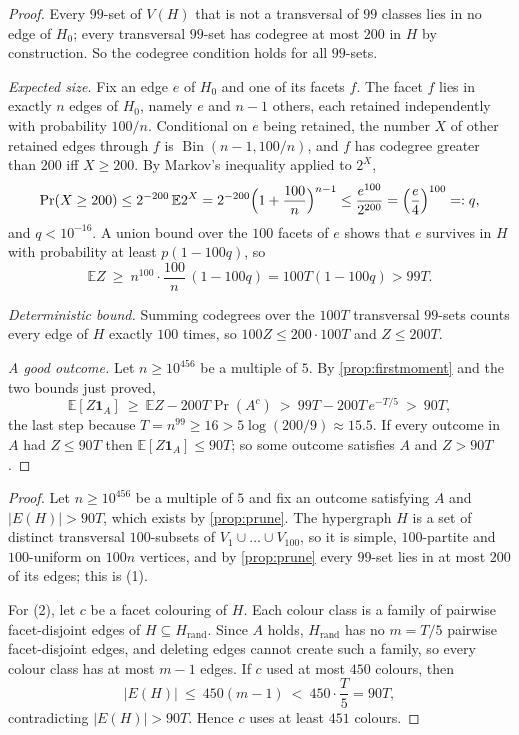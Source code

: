 \documentclass[11pt,a4paper]{article}
\theoremstyle{plain}
\theoremstyle{definition}
\theoremstyle{remark}
\newcommand{\E}{\mathbb E}
\newcommand{\Hrand}{H_{\mathrm{rand}}}
\newcommand{\ind}{\mathbf 1}
\DeclareMathOperator{\Bin}{Bin}
\begin{document}
\label{pf:prune}
\propPrune*
\begin{proof}
Every $99$-set of $V(H)$ that is not a transversal of $99$ classes lies in no edge of $H_0$; every transversal $99$-set has codegree at most $200$ in $H$ by construction. So the codegree condition holds for all $99$-sets.

\emph{Expected size.} Fix an edge $e$ of $H_0$ and one of its facets $f$. The facet $f$ lies in exactly $n$ edges of $H_0$, namely $e$ and $n-1$ others, each retained independently with probability $100/n$. Conditional on $e$ being retained, the number $X$ of other retained edges through $f$ is $\Bin(n-1,100/n)$, and $f$ has codegree greater than $200$ iff $X\ge200$. By Markov's inequality applied to $2^X$,
\[
\Pr(X\ge200)\le2^{-200}\,\E 2^X=2^{-200}\Bigl(1+\frac{100}n\Bigr)^{n-1}\le\frac{e^{100}}{2^{200}}=\Bigl(\frac e4\Bigr)^{100}=:q ,
\]
and $q<10^{-16}$. A union bound over the $100$ facets of $e$ shows that $e$ survives in $H$ with probability at least $p(1-100q)$, so
\[
\E Z\ \ge\ n^{100}\cdot\frac{100}n\,(1-100q)=100T(1-100q)>99T .
\]

\emph{Deterministic bound.} Summing codegrees over the $100T$ transversal $99$-sets counts every edge of $H$ exactly $100$ times, so $100Z\le200\cdot100T$ and $Z\le200T$.

\emph{A good outcome.} Let $n\ge10^{456}$ be a multiple of $5$. By \cref{prop:firstmoment} and the two bounds just proved,
\[
\E[Z\ind_A]\ \ge\ \E Z-200T\Pr(A^c)\ >\ 99T-200T\,e^{-T/5}\ >\ 90T,
\]
the last step because $T=n^{99}\ge16>5\log(200/9)\approx15.5$. If every outcome in $A$ had $Z\le90T$ then $\E[Z\ind_A]\le90T$; so some outcome satisfies $A$ and $Z>90T$.
\end{proof}

\label{pf:main}
\thmmain*
\begin{proof}
Let $n\ge10^{456}$ be a multiple of $5$ and fix an outcome satisfying $A$ and $|E(H)|>90T$, which exists by \cref{prop:prune}. The hypergraph $H$ is a set of distinct transversal $100$-subsets of $V_1\cup\dots\cup V_{100}$, so it is simple, $100$-partite and $100$-uniform on $100n$ vertices, and by \cref{prop:prune} every $99$-set lies in at most $200$ of its edges; this is (1).

For (2), let $c$ be a facet colouring of $H$. Each colour class is a family of pairwise facet-disjoint edges of $H\subseteq\Hrand$. Since $A$ holds, $\Hrand$ has no $m=T/5$ pairwise facet-disjoint edges, and deleting edges cannot create such a family, so every colour class has at most $m-1$ edges. If $c$ used at most $450$ colours, then
\[
|E(H)|\ \le\ 450(m-1)\ <\ 450\cdot\frac T5=90T,
\]
contradicting $|E(H)|>90T$. Hence $c$ uses at least $451$ colours.
\end{proof}
\end{document}
